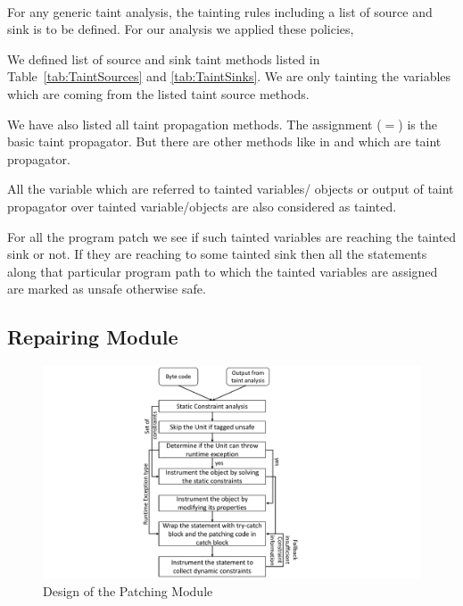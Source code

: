 ~\newline

For any generic taint analysis, the tainting rules including a list of source 
and sink is to be defined. For our analysis we applied these policies, 

\begin{mylist}
  \item We defined list of source and sink taint methods listed in
  Table~\ref{tab:TaintSources} and \ref{tab:TaintSinks}. We are only tainting
  the variables which are coming from the listed taint source methods.
  
  \item We have also listed all taint propagation methods. The assignment ($=$)
  is the basic taint propagator. But there are other methods like 
  in  and  which are
  taint propagator.

  \item All the variable which are referred to tainted variables/ objects or
  output of taint propagator over tainted variable/objects are also considered
  as tainted.

  \item For all the program patch we see if such tainted variables are reaching
  the tainted sink or not. If they are reaching to some tainted sink then all
  the statements along that particular program path to which the tainted
  variables are assigned are marked as unsafe otherwise safe.
\end{mylist}


\subsection{Repairing Module}
\label{subsec:RepairingModule}

\begin{figure}[t]
\centering
  \includegraphics[scale= .4]{images/PatchModule.pdf}
  \caption{Design of the Patching Module}
  \label{fig:PatchModule}
\end{figure}

